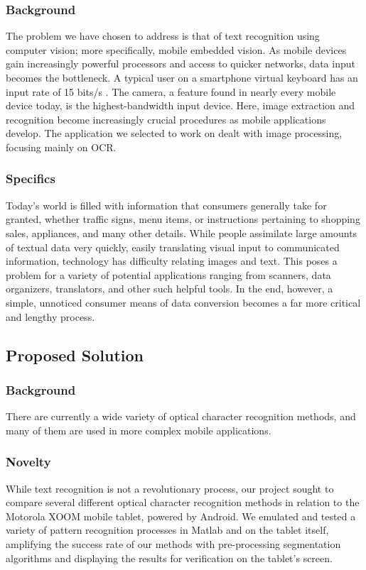 \subsubsection{Background}
The problem we have chosen to address is that of text recognition 
using computer vision; more specifically, mobile embedded vision. 
As mobile devices gain increasingly powerful processors and access 
to quicker networks, data input becomes the bottleneck. A typical 
user on a smartphone virtual keyboard has an input rate of 15 bits/s \cite{jeffBier}. 
The camera, a feature found in nearly every mobile device today, 
is the highest-bandwidth input device. Here, image extraction and 
recognition become increasingly crucial procedures as mobile 
applications develop. The application we selected to work on dealt 
with image processing, focusing mainly on OCR.

\subsubsection{Specifics}
Today's world is filled with information that consumers generally 
take for granted, whether traffic signs, menu items, or instructions 
pertaining to shopping sales, appliances, and many other details. 
While people assimilate large amounts of textual data very quickly, 
easily translating visual input to communicated information, technology 
has difficulty relating images and text. This poses a problem for a 
variety of potential applications ranging from scanners, data organizers, 
translators, and other such helpful tools. In the end, however, a simple, 
unnoticed consumer means of data conversion becomes a far more critical and 
lengthy process.\\



\subsection{Proposed Solution}

\subsubsection{Background}
There are currently a wide variety of 
optical character recognition methods, 
and many of them are used in more 
complex mobile applications.

\subsubsection{Novelty}
While text recognition is not a revolutionary process, 
our project sought to compare several different optical 
character recognition methods in relation to the Motorola XOOM 
mobile tablet, powered by Android. We emulated and tested a 
variety of pattern recognition processes in Matlab and on the 
tablet itself, amplifying the success rate of our methods with 
pre-processing segmentation algorithms and displaying the results 
for verification on the tablet's screen.\\



